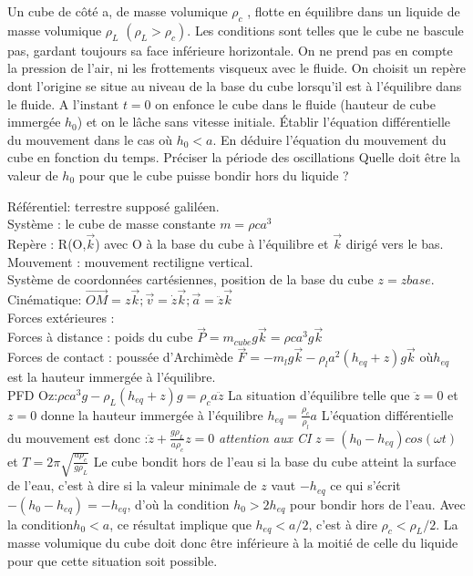 \begin{Exercise}[title=Cube flottant]
  Un cube de côté a, de masse volumique $\rho_c$ , flotte en équilibre dans un
  liquide de masse volumique $\rho_L$ $(\rho_L > \rho_c)$. Les conditions sont
  telles que le cube ne bascule pas, gardant toujours sa face inférieure
  horizontale. On ne prend pas en compte la pression de l’air, ni les
  frottements visqueux avec le fluide. On choisit un repère dont l’origine se
  situe au niveau de la base du cube lorsqu’il est à l’équilibre dans le fluide.
  A l’instant $t = 0$ on enfonce le cube dans le fluide (hauteur de cube
  immergée $h_0$) et on le lâche sans vitesse initiale.
  \Question Établir l’équation différentielle du mouvement dans le cas où $h_0<a$.
  \Question En déduire l’équation du mouvement du cube en fonction du temps. Préciser la
  période des oscillations
  \Question Quelle doit être la valeur de $h_0$ pour
  que le cube puisse bondir hors du liquide ?
\end{Exercise}
\begin{Answer}
  \Question Référentiel: terrestre supposé galiléen.\\
  Système : le cube de masse constante $m = \rho ca^3$ \\
  Repère : R(O,$\vec{k}$) avec O à la base du cube à l’équilibre et $\vec{k}$
  dirigé vers le bas.\\
  Mouvement : mouvement rectiligne vertical. \\
  Système de coordonnées cartésiennes, position de la base du cube  $z=zbase$.\\
  Cinématique: $\vec{OM}= z\vec{k} ; \vec{v} = \dot{z}\vec{k} ; \vec{a}=
  \ddot{z}\vec{k}$\\
  Forces extérieures :\\
  Forces à distance : poids du cube
  $\vec{P} = m_{cube} g\vec{k} = \rho ca^3 g \vec{k}$ \\
  Forces de contact : poussée d’Archimède $\vec{F} = -m_l g \vec{k} -\rho_l a^2(h_{eq} + z)g\vec{k}$
  où$h_{eq}$ est la hauteur immergée à l’équilibre. \\
  PFD Oz:$ \rho ca^3g -\rho_L(h_{eq} + z)g = \rho_ca\ddot{z}$ La situation d’équilibre
  telle que $\ddot{z}= 0 $ et $z = 0$ donne la hauteur immergée à l’équilibre
  $h_{eq} =\frac{\rho_c}{\rho_l}a$ L’équation différentielle du mouvement est
  donc :$\ddot{z}+\frac{g\rho_L}{a\rho_c}z=0$
  \Question \emph{attention aux CI}
  $z= (h_0-h_{eq})cos(\omega t)$ et $T=2\pi\sqrt{\frac{a\rho_c}{g\rho_L}}$
  \Question Le cube bondit hors de l’eau si la base du cube atteint la surface
  de l’eau, c’est à dire si la valeur minimale de $z$ vaut $-h_{eq}$ ce qui
  s’écrit $-(h_0 -h_{eq} ) = -h_{eq} $, d’où la condition $h_0 > 2h_{eq}$ pour
  bondir hors de l’eau. Avec la condition$ h_0 < a$, ce résultat implique que
  $h_{eq} < a/2$, c’est à dire $\rho_c < \rho_L/2$. La masse volumique du cube
  doit donc être inférieure à la moitié de celle du liquide pour que cette
  situation soit possible.
\end{Answer}
